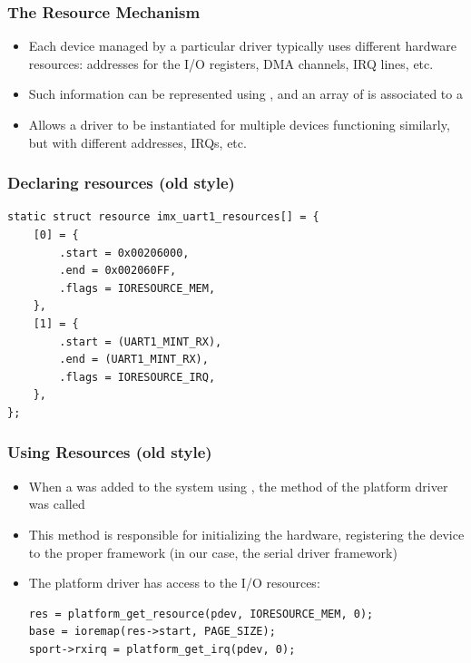 \begin{frame}
  \frametitle{The Resource Mechanism}
  \begin{itemize}
  \item Each device managed by a particular driver typically uses
    different hardware resources: addresses for the I/O registers, DMA
    channels, IRQ lines, etc.
  \item Such information can be represented using
    , and an array of  is
    associated to a 
  \item Allows a driver to be instantiated for multiple devices
    functioning similarly, but with different addresses, IRQs, etc.
  \end{itemize}
\end{frame}

\begin{frame}[fragile]
  \frametitle{Declaring resources (old style)}
  \begin{block}{}
  \begin{verbatim}
static struct resource imx_uart1_resources[] = {
    [0] = {
        .start = 0x00206000,
        .end = 0x002060FF,
        .flags = IORESOURCE_MEM,
    },
    [1] = {
        .start = (UART1_MINT_RX),
        .end = (UART1_MINT_RX),
        .flags = IORESOURCE_IRQ,
    },
};
\end{verbatim}
\end{block}
\end{frame}

\begin{frame}[fragile]
  \frametitle{Using Resources (old style)}
  \begin{itemize}
  \item When a  was added to the system using
    , the  method of the
    platform driver was called
  \item This method is responsible for initializing the hardware,
    registering the device to the proper framework (in our case, the
    serial driver framework)
  \item The platform driver has access to the I/O resources:
    \begin{block}{}
  \begin{verbatim}
res = platform_get_resource(pdev, IORESOURCE_MEM, 0);
base = ioremap(res->start, PAGE_SIZE);
sport->rxirq = platform_get_irq(pdev, 0);
  \end{verbatim}
  \end{block}
  \end{itemize}
\end{frame}

